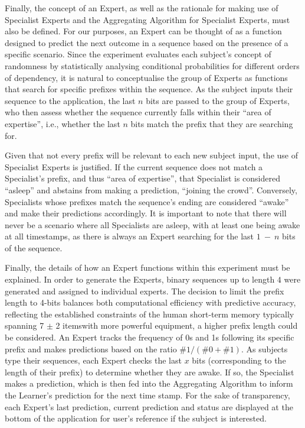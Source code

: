 Finally, the concept of an Expert, as well as the rationale for making use of Specialist Experts and the Aggregating Algorithm for Specialist Experts, must also be defined. For our purposes, an Expert can be thought of as a function designed to predict the next outcome in a sequence based on the presence of a specific scenario. Since the experiment evaluates each subject's concept of randomness by statistically analysing conditional probabilities for different orders of dependency, it is natural to conceptualise the group of Experts as functions that search for specific prefixes within the sequence. As the subject inputs their sequence to the application, the last $n$ bits are passed to the group of Experts, who then assess whether the sequence currently falls within their ``area of expertise'', i.e., whether the last $n$ bits match the prefix that they are searching for.

Given that not every prefix will be relevant to each new subject input, the use of Specialist Experts is justified. If the current sequence does not match a Specialist's prefix, and thus ``area of expertise'', that Specialist is considered ``asleep'' and abstains from making a prediction, ``joining the crowd''. Conversely, Specialists whose prefixes match the sequence's ending are considered ``awake'' and make their predictions accordingly. It is important to note that there will never be a scenario where all Specialists are asleep, with at least one being awake at all timestamps, as there is always an Expert searching for the last $1\ -\ n$ bits of the sequence.

Finally, the details of how an Expert functions within this experiment must be explained. In order to generate the Experts, binary sequences up to length $4$ were generated and assigned to individual experts. The decision to limit the prefix length to 4-bits balances both computational efficiency with predictive accuracy, reflecting the established constraints of the human short-term memory typically spanning 7 $\pm$ 2 items\textemdash{}with more powerful equipment, a higher prefix length could be considered. An Expert tracks the frequency of 0s and 1s following its specific prefix and makes predictions based on the ratio $\#1 / (\#0 + \#1)$. As subjects type their sequences, each Expert checks the last $x$ bits (corresponding to the length of their prefix) to determine whether they are awake. If so, the Specialist makes a prediction, which is then fed into the Aggregating Algorithm to inform the Learner's prediction for the next time stamp. For the sake of transparency, each Expert's last prediction, current prediction and status are displayed at the bottom of the application for user's reference if the subject is interested.

